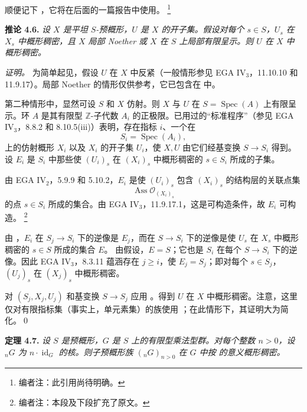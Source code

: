 顺便记下 ，它将在后面的一篇报告中使用。%
\footnote{编者注：此引用尚待明确。}

\medskip
\noindent{}\textbf{推论 4.6.}
\textit{设 \(X\) 是平坦 \(S\)-预概形，\(U\) 是 \(X\) 的开子集。假设对每个 \(s\in S\)，\(U_s\) 在 \(X_s\) 中概形稠密，且 \(X\) 局部 Noether 或 \(X\) 在 \(S\) 上局部有限呈示。则 \(U\) 在 \(X\) 中概形稠密。}

\emph{证明。}
为简单起见，假设 \(U\) 在 \(X\) 中反紧（一般情形参见 EGA IV\(_3\)，11.10.10 和 11.9.17）。局部 Noether 的情形仅供参考，它已包含在  中。

第二种情形中，显然可设 \(S\) 和 \(X\) 仿射。则 \(X\) 与 \(U\) 在 \(S=\operatorname{Spec}(A)\) 上有限呈示。环 \(A\) 是其有限型 \(\mathbb Z\)-子代数 \(A_i\) 的正极限。已用过的“标准程序”（参见 EGA IV\(_3\)，8.8.2 和 8.10.5(iii)）表明，存在指标 \(i\)、一个在
\[
  S_i=\operatorname{Spec}(A_i),
\]
上的仿射概形 \(X_i\) 以及 \(X_i\) 的开子集 \(U_i\)，使 \(X,U\) 由它们经基变换 \(S\to S_i\) 得到。设 \(E_i\) 是 \(S_i\) 中那些使 \((U_i)_s\) 在 \((X_i)_s\) 中概形稠密的 \(s\in S_i\) 所成的子集。

由 EGA IV\(_2\)，5.9.9 和 5.10.2，\(E_i\) 是使 \((U_i)_s\) 包含 \((X_i)_s\) 的结构层的关联点集
\[
  \operatorname{Ass}\mathscr O_{(X_i)_s}
\]
的点 \(s\in S_i\) 所成的集合。由 EGA IV\(_3\)，11.9.17.1，这是可构造条件，故 \(E_i\) 可构造。%
\footnote{编者注：本段及下段扩充了原文。}

由 ，\(E_i\) 在 \(S_j\to S_i\) 下的逆像是 \(E_j\)，而在 \(S\to S_i\) 下的逆像是使 \(U_s\) 在 \(X_s\) 中概形稠密的 \(s\in S\) 所成的集合 \(E\)。%
\footnotemark[24]
由假设，\(E=S\)；它也是 \(S_i\) 在每个 \(S\to S_i\) 下的逆像。因此 EGA IV\(_3\)，8.3.11 蕴涵存在 \(j\geq i\)，使 \(E_j=S_j\)；即对每个 \(s\in S_j\)，\((U_j)_s\) 在 \((X_j)_s\) 中概形稠密。

对 \((S_j,X_j,U_j)\) 和基变换 \(S\to S_j\) 应用 。得到 \(U\) 在 \(X\) 中概形稠密。注意，这里仅对有限指标集（事实上，单元素集）的族使用 ；在此情形下，其证明大为简化。\qed

\medskip
\noindent{}\textbf{定理 4.7.}
\textit{设 \(S\) 是预概形，\(G\) 是 \(S\) 上的有限型乘法型群。对每个整数 \(n>0\)，设 \({}_nG\) 为 \(n\cdot\operatorname{id}_G\) 的核。则子预概形族 \(({}_nG)_{n>0}\) 在 \(G\) 中按  的意义概形稠密。}

